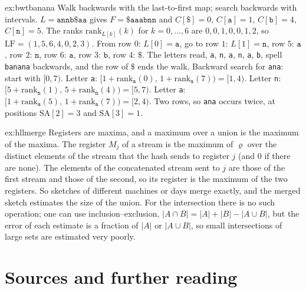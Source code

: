 \begin{solution}{ex:bwtbanana}
\idea Walk backwards with the last-to-first map; search backwards with intervals.
\writeup $L=\texttt{annb\$aa}$ gives $F=\texttt{\$aaabnn}$ and $C[\$]=0$, $C[\texttt a]=1$, $C[\texttt b]=4$, $C[\texttt n]=5$. The ranks $\mathrm{rank}_{L[k]}(k)$ for $k=0,\dots,6$ are $0,0,1,0,0,1,2$, so $\mathrm{LF}=(1,5,6,4,0,2,3)$. From row $0$: $L[0]=\texttt a$, go to row $1$: $L[1]=\texttt n$, row $5$: $\texttt a$, row $2$: $\texttt n$, row $6$: $\texttt a$, row $3$: $\texttt b$, row $4$: $\$$. The letters read, \texttt a, \texttt n, \texttt a, \texttt n, \texttt a, \texttt b, spell \texttt{banana} backwards, and the row of $\$$ ends the walk.
Backward search for \texttt{ana}: start with $[0,7)$. Letter \texttt a: $[1+\mathrm{rank}_{\texttt a}(0),\,1+\mathrm{rank}_{\texttt a}(7))=[1,4)$. Letter \texttt n: $[5+\mathrm{rank}_{\texttt n}(1),\,5+\mathrm{rank}_{\texttt n}(4))=[5,7)$. Letter \texttt a: $[1+\mathrm{rank}_{\texttt a}(5),\,1+\mathrm{rank}_{\texttt a}(7))=[2,4)$. Two rows, so \texttt{ana} occurs twice, at positions $\mathrm{SA}[2]=3$ and $\mathrm{SA}[3]=1$.
\end{solution}

\begin{solution}{ex:hllmerge}
\idea Registers are maxima, and a maximum over a union is the maximum of the maxima.
\writeup The register $M_j$ of a stream is the maximum of $\varrho$ over the distinct elements of the stream that the hash sends to register $j$ (and $0$ if there are none). The elements of the concatenated stream sent to $j$ are those of the first stream and those of the second, so its register is the maximum of the two registers. So sketches of different machines or days merge exactly, and the merged sketch estimates the size of the union. For the intersection there is no such operation; one can use inclusion--exclusion, $|A\cap B|=|A|+|B|-|A\cup B|$, but the error of each estimate is a fraction of $|A|$ or $|A\cup B|$, so small intersections of large sets are estimated very poorly.
\end{solution}

\section*{Sources and further reading}

